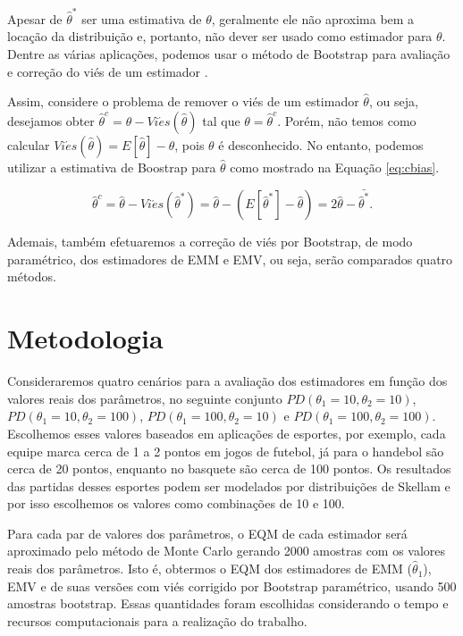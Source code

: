 \documentclass[12pt]{article}
\theoremstyle{definition}
\begin{document}
Apesar de ${\hat \theta}^*$ ser uma estimativa de $\theta$, geralmente ele não aproxima bem a locação da distribuição e, portanto, não dever ser usado como estimador para $\theta$. Dentre as várias aplicações, podemos usar o método de Bootstrap para avaliação e correção do viés de um estimador \cite{efron1993}.

Assim, considere o problema de remover o viés de um estimador $\hat \theta$, ou seja, desejamos obter $\hat \theta ^ c = \hat \theta - Vi\acute es(\hat \theta)$ tal que $\theta = \hat \theta ^ c$. Porém, não temos como calcular $Vi\acute es(\hat \theta) = E[\hat \theta] - \theta$, pois $\theta$ é desconhecido. No entanto, podemos utilizar a estimativa de Boostrap para $\hat \theta$ como mostrado na Equação \ref{eq:cbias}\cite{efron1993}.

\begin{equation*}
    \label{eq:cbias}
    \hat \theta ^ c = \hat \theta - Vi\acute es({\hat \theta}^*) =\hat \theta - (E[{\hat \theta}^*] - \hat \theta) = 2 \hat \theta - \bar{{\hat \theta}^*}.
\end{equation*}

Ademais, também efetuaremos a correção de viés por Bootstrap, de modo paramétrico, dos estimadores de EMM e EMV, ou seja, serão comparados quatro métodos.

\section{Metodologia}

Consideraremos quatro cenários para a avaliação dos estimadores em função dos valores reais dos parâmetros, no seguinte conjunto $PD(\theta_1=10,\theta_2=10)$, $PD(\theta_1=10,\theta_2=100)$, $PD(\theta_1=100,\theta_2=10)$ e $PD(\theta_1=100,\theta_2=100)$. Escolhemos esses valores baseados em aplicações de esportes, por exemplo, cada equipe marca cerca de 1 a 2 pontos em jogos de futebol, já para o handebol são cerca de 20 pontos, enquanto no basquete são cerca de 100 pontos. Os resultados das partidas desses esportes podem ser modelados por distribuições de Skellam e por isso escolhemos os valores como combinações de 10 e 100.

Para cada par de valores dos parâmetros, o EQM de cada estimador será aproximado pelo método de Monte Carlo gerando 2000 amostras com os valores reais dos parâmetros. Isto é, obtermos o EQM dos estimadores de EMM ($\hat \theta_1$), EMV e de suas versões com viés corrigido por Bootstrap paramétrico, usando 500 amostras bootstrap. Essas quantidades foram escolhidas considerando o tempo e recursos computacionais para a realização do trabalho.
\end{document}
